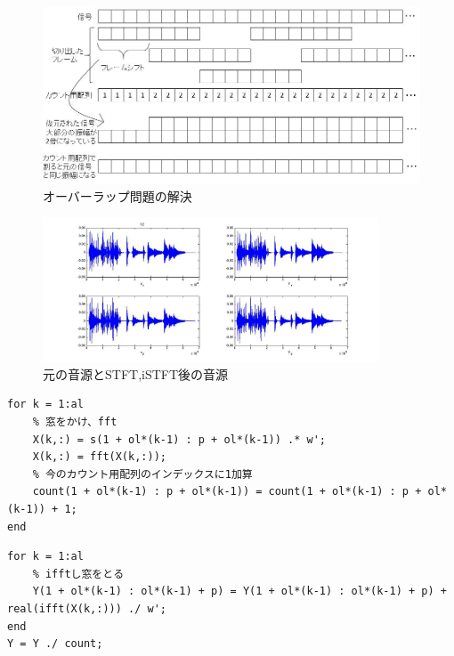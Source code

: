 \documentclass[a4j]{jarticle}
\begin{document}
\newpage
\begin{figure}[htb]
 \begin{center}
  \includegraphics[width=20cm, clip, bb=-250 0 974 455]{pic/countX.jpg}
  \caption{オーバーラップ問題の解決}
  \label{countX}
 \end{center}
\end{figure}

\begin{figure}[htb]
 \begin{center}
  \includegraphics[width=10cm, clip, bb=0 0 1089 467]{pic/stft.jpg}
  \caption{元の音源とSTFT,iSTFT後の音源}
  \label{stftistft}
 \end{center}
\end{figure}

\begin{lstlisting}[caption=stft.m, xleftmargin=1cm, label=stft.m]
for k = 1:al
    % 窓をかけ、fft
    X(k,:) = s(1 + ol*(k-1) : p + ol*(k-1)) .* w';
    X(k,:) = fft(X(k,:));
    % 今のカウント用配列のインデックスに1加算
    count(1 + ol*(k-1) : p + ol*(k-1)) = count(1 + ol*(k-1) : p + ol*(k-1)) + 1;
end
\end{lstlisting}
\begin{lstlisting}[caption=istft.m, xleftmargin=1cm, label=istft.m]
for k = 1:al
    % ifftし窓をとる
    Y(1 + ol*(k-1) : ol*(k-1) + p) = Y(1 + ol*(k-1) : ol*(k-1) + p) + real(ifft(X(k,:))) ./ w';
end
Y = Y ./ count;
\end{lstlisting}
\end{document}
